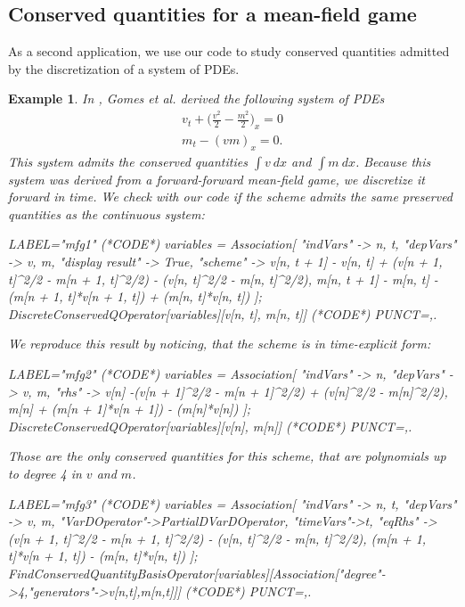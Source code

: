 \documentclass[sigconf,twocolumn]{acmart}
\newcommand{\1}{{\chi}}
\numberwithin{equation}{section}
\theoremstyle{thmlemcorr}
\numberwithin{theorem}{section}
\theoremstyle{thmlemcorr*}
\theoremstyle{defi}
\theoremstyle{remexample}
\newtheorem{example}[theorem]{Example}
\theoremstyle{ass}
\begin{document}
\subsection*{Conserved quantities for a mean-field game}
As a second application, we use our code to study conserved quantities admitted by the discretization of a system of PDEs.
\begin{example}
	In \cite{gomes18}, Gomes et al. derived the following system of PDEs
	\begin{gather*}
		v_t+\Big(\frac{v^2}{2}-\frac{m^2}{2}\Big)_x=0\\
		m_t-(vm)_x=0.
	\end{gather*}
	This system admits the conserved quantities $\int v\ dx$ and $\int m\ dx$.
	Because this system was derived from a forward-forward mean-field game, we discretize it forward in time. We check with our code if the scheme admits the same preserved quantities as the continuous system:
	\begin{EXE}
		LABEL="mfg1"
		(*CODE*)
		variables = Association[
		"indVars" -> {n, t},
		"depVars" -> {v, m},
		"display result" -> True,
		"scheme" -> {v[n, t + 1] - 
			v[n, 
			t] + (v[n + 1, t]^2/2 - m[n + 1, t]^2/2) - (v[n, t]^2/2 - 
			m[n, t]^2/2), 
			m[n, t + 1] - 
			m[n, t] - (m[n + 1, t]*v[n + 1, t]) + (m[n, t]*v[n, t])}
		];
		DiscreteConservedQOperator[variables][{v[n, t], m[n, t]}]
		(*CODE*)
		PUNCT={,.}
	\end{EXE}
	\begin{small}
		
		
	\end{small}
	We reproduce this result by noticing, that the scheme is in time-explicit form:
	\begin{EXE}
		LABEL="mfg2"
		(*CODE*)
		variables = Association[
		"indVars" -> {n},
		"depVars" -> {v, m},
		"rhs" -> { 
			v[n] -(v[n + 1]^2/2 - m[n + 1]^2/2) + (v[n]^2/2 - 
			m[n]^2/2), 
			m[n] + (m[n + 1]*v[n + 1]) - (m[n]*v[n])}
		];
		DiscreteConservedQOperator[variables][{v[n], m[n]}]
		(*CODE*)
		PUNCT={,.}
	\end{EXE}
	\begin{small}
		
		
	\end{small}
	Those are the only conserved quantities for this scheme, that are polynomials up to degree 4 in $v$ and $m$.
	\begin{EXE}
		LABEL="mfg3"
		(*CODE*)
		variables = Association[
		"indVars" -> {n, t},
		"depVars" -> {v, m},
		"VarDOperator"->PartialDVarDOperator,
		"timeVars"->{t},
		"eqRhs" -> { 
			(v[n + 1, t]^2/2 - m[n + 1, t]^2/2) - (v[n, t]^2/2 - 
			m[n, t]^2/2), 
			(m[n + 1, t]*v[n + 1, t]) - (m[n, t]*v[n, t])}
		];
		FindConservedQuantityBasisOperator[variables][Association["degree"->4,"generators"->{v[n,t],m[n,t]}]]
		(*CODE*)
		PUNCT={,.}
	\end{EXE}
	\begin{small}
		
		
	\end{small}
\end{example}
\end{document}
